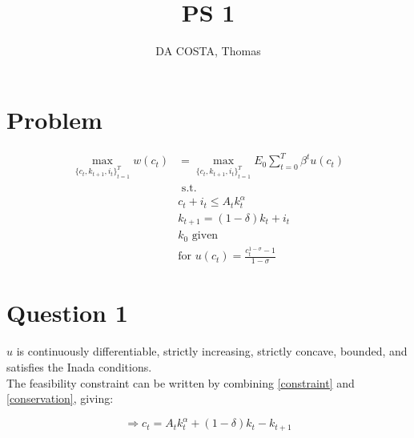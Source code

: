 \documentclass[a4paper,12pt]{article}
\title{PS 1}
\author{DA COSTA, Thomas}
\date{ }
\begin{document}
\maketitle

\section{Problem}

\begin{align}
    \max_{{\{c_t, k_{t+1}, i_t\}}_{t = 1}^T} w(c_t) &= 
    \max_{{\{c_t, k_{t+1}, i_t\}}_{t = 1}^T} E_0 \sum_{t = 0}^T \beta^t u(c_t) \\ 
    &\text{ s.t. } \\
    & c_t + i_t\leq A_t k_t^\alpha \label{constraint}\\
    & k_{t+1} = (1 - \delta) k_t + i_t \label{conservation}\\
    & k_0 \text{ given} \\
    & \text{for } u(c_t) = \frac{c_t^{1 - \sigma} - 1}{1 - \sigma}
\end{align}

\section{Question 1} \label{Q1}
$u$ is continuously differentiable, strictly
increasing, strictly concave, bounded, and satisfies the Inada 
conditions. \\

The feasibility constraint can be written by combining \ref{constraint} and 
\ref{conservation}, giving:

\begin{equation}
    \Rightarrow c_t = A_t k_t^\alpha + (1 - \delta) k_t - k_{t+1} \label{eq:feasibility}
\end{equation}



\end{document}
